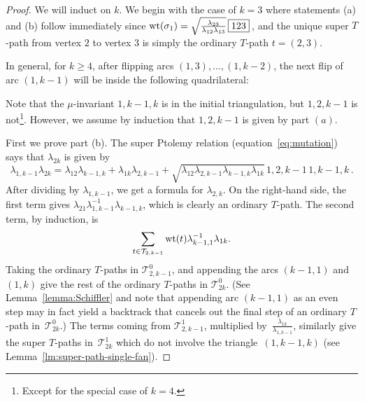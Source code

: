 \documentclass[pdftex]{sigma}
\newcommand{\midarrow}{\tikz \draw[-triangle 90] (0,0) -- +(.1,0);}
\numberwithin{equation}{section}
\begin{document}
\begin{proof}
 We will induct on $k$. We begin with the case of $k=3$ where statements (a) and (b) follow immediately since
 ${\rm wt}(\sigma_1) = \sqrt{\frac{\lambda_{23}}{\lambda_{12}\lambda_{13}}} \, \boxed{123}$\,, and the unique super $T$-path from vertex $2$ to vertex $3$
 is simply the ordinary $T$-path $t = (2,3)$.

 In general, for $k\geq 4$, after flipping arcs $(1,3),\dots,(1,k-2)$, the next flip of arc $(1,k-1)$ will be inside the following quadrilateral:
 \begin{center}
 \end{center}
 Note that the $\mu$-invariant $\boxed{1,k-1,k}$ is in the initial triangulation, but $\boxed{1,2,k-1}$ is not\footnote{Except for the special case of $k=4$.}.
 However, we assume by induction that $\boxed{1,2,k-1}$ is given by part $(a)$.

 First we prove part (b).
 The super Ptolemy relation (equation~\eqref{eq:mutation}) says that $\lambda_{2k}$ is given by
 \[
 \lambda_{1,k-1}\lambda_{2k} = \lambda_{12}\lambda_{k-1,k} + \lambda_{1k}\lambda_{2,k-1}
 + \sqrt{\lambda_{12}\lambda_{2,k-1}\lambda_{k-1,k}\lambda_{1k}} \, \boxed{1,2,k-1} \, \boxed{1,k-1,k}\,.
 \]
 After dividing by $\lambda_{1,k-1}$, we get a formula for $\lambda_{2,k}$. On the right-hand side, the first term gives
 $\lambda_{21}\lambda_{1,k-1}^{-1}\lambda_{k-1,k}$, which is clearly an ordinary $T$-path. The second term, by induction, is
 \[ \sum_{t \in \mathcal{T}_{2,k-1}} {\rm wt}(t) \lambda_{k-1,1}^{-1} \lambda_{1k}. \]
 Taking the ordinary $T$-paths in $\mathcal{T}^0_{2,k-1}$, and appending the arcs $(k-1,1)$ and $(1,k)$ give the rest of the ordinary $T$-paths
 in $\mathcal{T}^0_{2k}$. (See Lemma~\ref{lemma:Schiffler} and note that appending arc $(k-1,1)$ as an even step may in fact yield a backtrack that cancels out the final step of an ordinary $T$-path in~$\mathcal{T}^0_{2k}$.) The terms coming from $\mathcal{T}^1_{2,k-1}$, multiplied by~$\frac{\lambda_{1k}}{\lambda_{1,k-1}}$, similarly give the super $T$-paths
 in~$\mathcal{T}^1_{2k}$ which do not involve the triangle~$(1,k-1,k)$ (see Lemma~\ref{lm:super-path-single-fan}).


\end{proof}
\end{document}
